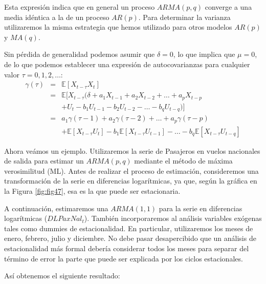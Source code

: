 \documentclass[
]{book}
\begin{document}
Esta expresión indica que en general un proceso \(ARMA(p, q)\) converge a una media idéntica a la de un proceso \(AR(p)\). Para determinar la varianza utilizaremos la misma estrategia que hemos utilizado para otros modelos \(AR(p)\) y \(MA(q)\).

Sin pérdida de generalidad podemos asumir que \(\delta = 0\), lo que implica que \(\mu = 0\), de lo que podemos establecer una expresión de autocovarianzas para cualquier valor \(\tau = 0, 1, 2, \ldots\):
\begin{eqnarray}
    \gamma(\tau) & = & \mathbb{E}[X_{t-\tau} X_t] \nonumber \\
    & = & \mathbb{E}[X_{t-\tau} (\delta + a_1 X_{t - 1} + a_2 X_{t - 2} + \ldots + a_p X_{t - p} \nonumber \\
    &   & + U_t - b_1 U_{t - 1} - b_2  U_{t - 2} - \ldots - b_q  U_{t - q})] \nonumber \\
    & = & a_1 \gamma(\tau - 1) + a_2 \gamma(\tau - 2) + \ldots + a_p \gamma(\tau - p) \nonumber \\
    &   & + \mathbb{E}[X_{t-\tau} U_{t}] - b_1  \mathbb{E}[X_{t-\tau} U_{t-1}] - \ldots  - b_q  \mathbb{E}[X_{t-\tau} U_{t-q}] 
\end{eqnarray}

Ahora veámos un ejemplo. Utilizaremos la serie de Pasajeros en vuelos nacionales de salida para estimar un \(ARMA(p, q)\) mediante el método de máxima verosimilitud (ML). Antes de realizar el proceso de estimación, consideremos una transformación de la serie en diferencias logarítmicas, ya que, según la gráfica en la Figura \ref{fig:fig47}, esa es la que puede ser estacionaria.

A continuación, estimaremos una \(ARMA(1, 1)\) para la serie en diferencias logarítmicas (\(DLPaxNal_t\)). También incorporaremos al análisis variables exógenas tales como dummies de estacionalidad. En particular, utilizaremos los meses de enero, febrero, julio y diciembre. No debe pasar desapercibido que un análisis de estacionalidad más formal debería considerar todos los meses para separar del término de error la parte que puede ser explicada por los ciclos estacionales.

Así obtenemos el siguiente resultado:
\end{document}
